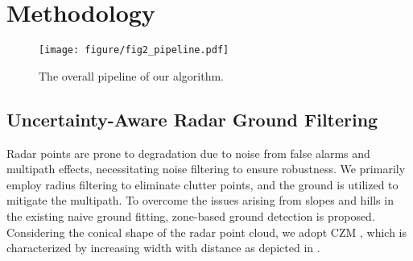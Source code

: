 \section{Methodology}
\label{sec:method}

\begin{figure}[!t]
    \centering
    \texttt{[image: figure/fig2\_pipeline.pdf]}
    \caption{
        The overall pipeline of our algorithm.
    }
    \label{fig:pipeline}
    \vspace{-7mm}
\end{figure}


\subsection{Uncertainty-Aware Radar Ground Filtering}
\label{subsec: ground segmentation}

Radar points are prone to degradation due to noise from false alarms and multipath effects, necessitating noise filtering to ensure robustness.
We primarily employ radius filtering to eliminate clutter points, and the ground is utilized to mitigate the multipath.
To overcome the issues arising from slopes and hills in the existing naive ground fitting, zone-based ground detection is proposed.
Considering the conical shape of the radar point cloud, we adopt \ac{CZM} \cite{lee2022patchworkpp}, which is characterized by increasing width with distance as depicted in .


